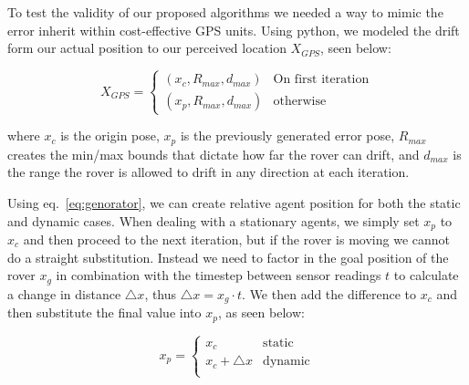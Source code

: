 To test the validity of our proposed algorithms we needed a way to mimic the error inherit within cost-effective GPS units. Using python, we modeled the drift form our actual position to our perceived location $X_{GPS}$, seen below:

\begin{equation}
	X_{GPS} = 
	\begin{cases}
	(x_c, R_{max}, d_{max}) & \text{On first iteration} \\
	(x_p, R_{max}, d_{max}) & \text{otherwise}
	\end{cases}
	\label{eq:genorator}
\end{equation}

where $x_c$ is the origin pose, $x_p$ is the previously generated error pose, $R_{max}$ creates the min/max bounds that dictate how far the rover can drift, and $d_{max}$ is the range the rover is allowed to drift in any direction at each iteration. 

Using eq.~\ref{eq:genorator}, we can create relative agent position for both the static and dynamic cases. When dealing with a stationary agents, we simply set $x_p$ to $x_c$ and then proceed to the next iteration, but if the rover is moving we cannot do a straight substitution. Instead we need to factor in the goal position of the rover $x_g$ in combination with the timestep between sensor readings $t$ to calculate a change in distance $\triangle x$, thus $\triangle x = x_g \cdot t$. We then add the difference to $x_c$ and then substitute the final value into $x_p$, as seen below:

\begin{equation}
x_p = 
	\begin{cases}
		x_c & \text{static} \\
		x_c + \triangle x & \text{dynamic}\\
	\end{cases}
	\label{eq:genorator_expln}
\end{equation}

